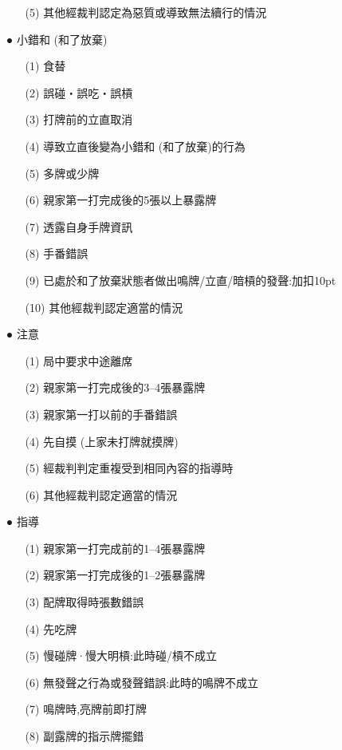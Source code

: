 \documentclass[a4paper,12pt]{article}
\begin{document}
\begin{itemize}
\begin{itemize}
        \item[(5)] 其他經裁判認定為惡質或導致無法續行的情況
    \end{itemize}
    \item[●] 小錯和 (和了放棄)
    \begin{itemize}
        \item[(1)] 食替
        \item[(2)] 誤碰・誤吃・誤槓
        \item[(3)] 打牌前的立直取消
        \item[(4)] 導致立直後變為小錯和 (和了放棄)的行為
        \item[(5)] 多牌或少牌
        \item[(6)] 親家第一打完成後的5張以上暴露牌
        \item[(7)] 透露自身手牌資訊
        \item[(8)] 手番錯誤
        \item[(9)] 已處於和了放棄狀態者做出鳴牌/立直/暗槓的發聲:加扣10pt
        \item[(10)] 其他經裁判認定適當的情況
    \end{itemize}
    \item[●] 注意
     \begin{itemize}
        \item[(1)] 局中要求中途離席
        \item[(2)] 親家第一打完成後的3--4張暴露牌
        \item[(3)] 親家第一打以前的手番錯誤
        \item[(4)] 先自摸 (上家未打牌就摸牌)
        \item[(5)] 經裁判判定重複受到相同內容的指導時
        \item[(6)] 其他經裁判認定適當的情況
    \end{itemize}
    \item[●] 指導
    \begin{itemize}
        \item[(1)] 親家第一打完成前的1--4張暴露牌
        \item[(2)] 親家第一打完成後的1--2張暴露牌 
        \item[(3)] 配牌取得時張數錯誤
        \item[(4)] 先吃牌
        \item[(5)] 慢碰牌·慢大明槓:此時碰/槓不成立
        \item[(6)] 無發聲之行為或發聲錯誤:此時的鳴牌不成立
        \item[(7)] 鳴牌時,亮牌前即打牌
        \item[(8)] 副露牌的指示牌擺錯

\end{itemize}
\end{itemize}
\end{document}
